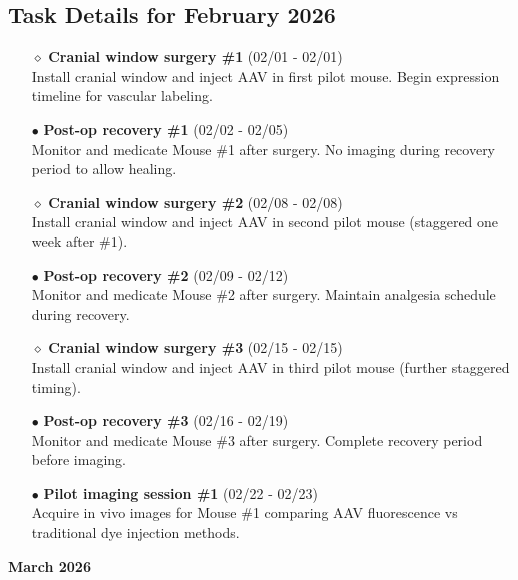 \documentclass[landscape,a4paper]{article}
\begin{document}
\subsection{Task Details for February 2026}
\begin{itemize}[leftmargin=1cm]
    \item[\textcolor{other}{$\diamond$}] \textbf{Cranial window surgery \#1} (02/01 - 02/01)\\ Install cranial window and inject AAV in first pilot mouse. Begin expression timeline for vascular labeling.
    \item[\textcolor{other}{$\bullet$}] \textbf{Post-op recovery \#1} (02/02 - 02/05)\\ Monitor and medicate Mouse \#1 after surgery. No imaging during recovery period to allow healing.
    \item[\textcolor{other}{$\diamond$}] \textbf{Cranial window surgery \#2} (02/08 - 02/08)\\ Install cranial window and inject AAV in second pilot mouse (staggered one week after \#1).
    \item[\textcolor{other}{$\bullet$}] \textbf{Post-op recovery \#2} (02/09 - 02/12)\\ Monitor and medicate Mouse \#2 after surgery. Maintain analgesia schedule during recovery.
    \item[\textcolor{other}{$\diamond$}] \textbf{Cranial window surgery \#3} (02/15 - 02/15)\\ Install cranial window and inject AAV in third pilot mouse (further staggered timing).
    \item[\textcolor{other}{$\bullet$}] \textbf{Post-op recovery \#3} (02/16 - 02/19)\\ Monitor and medicate Mouse \#3 after surgery. Complete recovery period before imaging.
    \item[\textcolor{other}{$\bullet$}] \textbf{Pilot imaging session \#1} (02/22 - 02/23)\\ Acquire in vivo images for Mouse \#1 comparing AAV fluorescence vs traditional dye injection methods.
\end{itemize}

\newpage
\pagestyle{empty}

\begin{center}
{\large\textbf{March 2026}}
\end{center}

\vspace{0.5cm}
\end{document}
